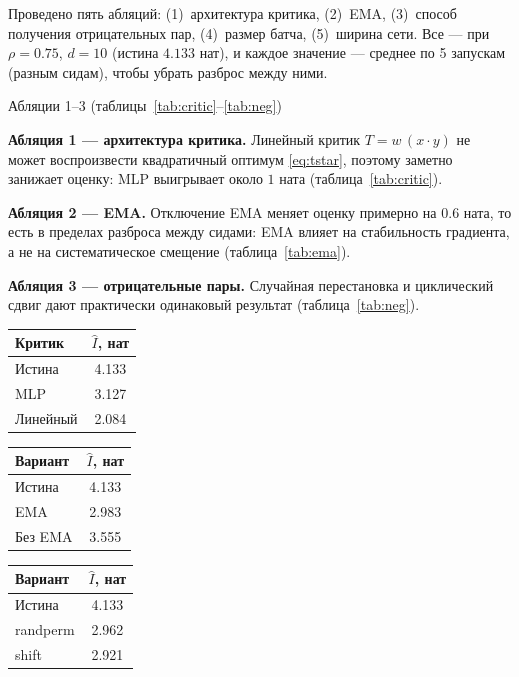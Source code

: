 \documentclass[10pt,a4paper]{article}
\newcommand{\sublesson}[2]{%
  \par\addvspace{10pt}%
  \noindent{\bfseries\fontsize{10.8}{13}\selectfont #1\enspace#2}\par
  \addvspace{3pt}}
\begin{document}
\sublesson{5.5}{Абляционные эксперименты}

Проведено пять абляций: (1)~архитектура критика, (2)~EMA, (3)~способ получения
отрицательных пар, (4)~размер батча, (5)~ширина сети. Все — при $\rho=0.75$,
$d=10$ (истина $4.133$ нат), и каждое значение — среднее по 5 запускам
(разным сидам), чтобы убрать разброс между ними.

{\fontsize{9}{11}\selectfont\color{muted}Абляции 1--3
(таблицы~\ref{tab:critic}--\ref{tab:neg})}\par\addvspace{3pt}

\textbf{Абляция 1 — архитектура критика.} Линейный критик $T=w\,(x\cdot y)$ не
может воспроизвести квадратичный оптимум \eqref{eq:tstar}, поэтому заметно
занижает оценку: MLP выигрывает около $1$ ната (таблица~\ref{tab:critic}).

\textbf{Абляция 2 — EMA.} Отключение EMA меняет оценку примерно на $0.6$ ната,
то есть в пределах разброса между сидами: EMA влияет на стабильность градиента,
а не на систематическое смещение (таблица~\ref{tab:ema}).

\textbf{Абляция 3 — отрицательные пары.} Случайная перестановка и циклический
сдвиг дают практически одинаковый результат (таблица~\ref{tab:neg}).

\par\addvspace{6pt}
\noindent
\begin{minipage}[t]{0.315\linewidth}\centering
  \label{tab:critic}
  \begin{tabular}{lc}
  \toprule
  Критик & $\hat I$, нат \\
  \midrule
  Истина & 4.133 \\
  MLP & 3.127 \\
  Линейный & 2.084 \\
  \bottomrule
  \end{tabular}
\end{minipage}\hfill
\begin{minipage}[t]{0.315\linewidth}\centering
  \label{tab:ema}
  \begin{tabular}{lc}
  \toprule
  Вариант & $\hat I$, нат \\
  \midrule
  Истина & 4.133 \\
  EMA & 2.983 \\
  Без EMA & 3.555 \\
  \bottomrule
  \end{tabular}
\end{minipage}\hfill
\begin{minipage}[t]{0.315\linewidth}\centering
  \label{tab:neg}
  \begin{tabular}{lc}
  \toprule
  Вариант & $\hat I$, нат \\
  \midrule
  Истина & 4.133 \\
  randperm & 2.962 \\
  shift & 2.921 \\
  \bottomrule
  \end{tabular}
\end{minipage}\par\addvspace{6pt}
\end{document}
